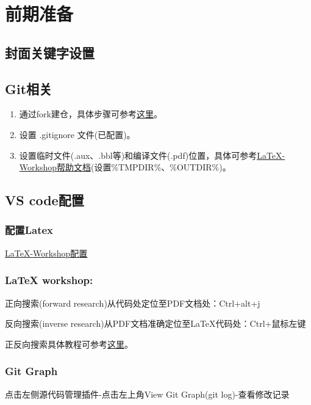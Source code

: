 \documentclass[engineeringmaster]{hquThesis}
\begin{document}
\makecover



\frontmatter{
    
    \tableofcontents
}

\mainmatter
\chapter{前期准备}
\section{封面关键字设置}
\section{Git相关}
\begin{enumerate}
    \item 通过fork建仓，具体步骤可参考\href{https://docs.github.com/en/repositories/creating-and-managing-repositories/creating-a-template-repository}{这里}。
    \item 设置 .gitignore 文件(已配置)。
\item 设置临时文件(.aux、.bbl等)和编译文件(.pdf)位置，具体可参考\href{https://github.com/James-Yu/LaTeX-Workshop/wiki/Compile#latex-tools}{LaTeX-Workshop帮助文档}(设置\%TMPDIR\%、\%OUTDIR\%)。
\end{enumerate}

\section{VS code配置}
\subsection*{配置Latex}
\href{https://github.com/James-Yu/LaTeX-Workshop/wiki/Compile#latex-tools}{LaTeX-Workshop配置}
\subsection*{LaTeX workshop: }

正向搜索(forward research)从代码处定位至PDF文档处：Ctrl+alt+j

反向搜索(inverse research)从PDF文档准确定位至LaTeX代码处：Ctrl+鼠标左键

正反向搜索具体教程可参考\href{https://github.com/James-Yu/LaTeX-Workshop/wiki/View#synctex}{这里}。
\subsection*{Git Graph}
点击左侧源代码管理插件-点击左上角View Git Graph(git log)-查看修改记录
\end{document}
